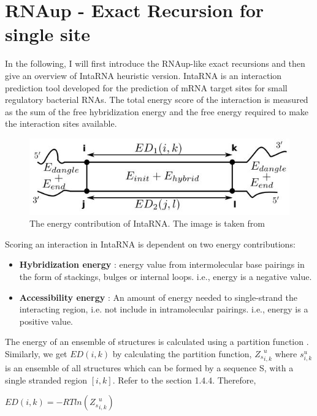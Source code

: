 \documentclass[twoside,a4paper]{report}
\begin{document}
	\section{RNAup - Exact Recursion for single site}
	
	In the following, I will first introduce the RNAup-like exact recursions and then give an overview of IntaRNA heuristic version. IntaRNA is an interaction prediction tool developed for the prediction of mRNA target sites for small regulatory bacterial RNAs. The total energy score of the interaction is measured as the sum of the free hybridization energy and the free energy required to make the interaction sites available.\\
	
		\begin{figure}[tb]
		\includegraphics[width=0.6\linewidth]{inta}
		\centering
		\caption{ The energy contribution of IntaRNA. The image is taken from \citep{gelhausen2018constrained} } 
		\label{fig:inta}
	\end{figure}
	
	Scoring an interaction in IntaRNA is dependent on two energy contributions:\\
	
	\begin{itemize}
		\item \textbf{Hybridization energy} : energy value from intermolecular base pairings in the form of stackings, bulges or internal loops.  i.e., energy is a negative value. 
		\item \textbf{Accessibility energy} : An amount of energy needed to single-strand the interacting region, i.e. not include in intramolecular pairings. i.e., energy is a positive value. 
	\end{itemize}
	
	
	The energy of an ensemble of structures is calculated using a partition function \citep{mccaskill1990equilibrium} . Similarly, we get $ED(i,k)$ by calculating the partition function, ${Z_s}_{i,k}^{u}$ where $s_{i,k}^{u} $ is an ensemble of all structures which can be formed by a sequence S, with a single stranded region $[i,k]$. Refer to the section 1.4.4. Therefore,
	
		\begin{center}
		
		$ED(i,k) = - RTln({Z_s}_{i,k}^{u})$
		
	\end{center}
	
\end{document}
